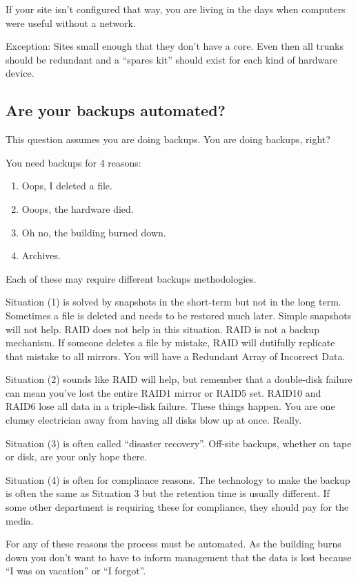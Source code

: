 \documentclass{article}
\begin{document}
If your site isn't configured that way, you are living in the days when computers were useful without a network.

Exception: Sites small enough that they don't have a core. Even then all trunks should be redundant and a ``spares kit'' should exist for each kind of hardware device.

\subsection{Are your backups automated?}
This question assumes you are doing backups. You are doing backups, right?

You need backups for 4 reasons:

\begin{enumerate}
    \item Oops, I deleted a file.
    \item Ooops, the hardware died.
    \item Oh no, the building burned down.
    \item Archives.
\end{enumerate}

Each of these may require different backups methodologies.

Situation (1) is solved by snapshots in the short-term but not in the long term. Sometimes a file is deleted and needs to be restored much later. Simple snapshots will not help. RAID does not help in this situation. RAID is not a backup mechanism. If someone deletes a file by mistake, RAID will dutifully replicate that mistake to all mirrors. You will have a Redundant Array of Incorrect Data.

Situation (2) sounds like RAID will help, but remember that a double-disk failure can mean you've lost the entire RAID1 mirror or RAID5 set. RAID10 and RAID6 lose all data in a triple-disk failure. These things happen. You are one clumsy electrician away from having all disks blow up at once. Really.

Situation (3) is often called ``disaster recovery''. Off-site backups, whether on tape or disk, are your only hope there.

Situation (4) is often for compliance reasons. The technology to make the backup is often the same as Situation 3 but the retention time is usually different. If some other department is requiring these for compliance, they should pay for the media.

For any of these reasons the process must be automated. As the building burns down you don't want to have to inform management that the data is lost because ``I was on vacation'' or ``I forgot''. 
\end{document}

